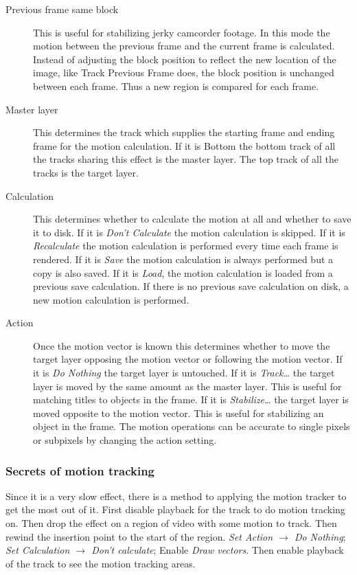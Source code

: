 \begin{description}
    \item[Previous frame same block] This is useful for stabilizing jerky camcorder footage. In this mode the motion between the previous frame and the current frame is calculated. Instead of adjusting the block position to reflect the new location of the image, like Track Previous Frame does, the block position is unchanged between each frame. Thus a new region is compared for each frame.
    \item[Master layer] This determines the track which supplies the starting frame and ending frame for the motion calculation. If it is Bottom the bottom track of all the tracks sharing this effect is the master layer. The top track of all the tracks is the target layer.
    \item[Calculation] This determines whether to calculate the motion at all and whether to save it to disk. If it is \textit{Don't Calculate} the motion calculation is skipped. If it is \textit{Recalculate} the motion calculation is performed every time each frame is rendered. If it is \textit{Save} the motion calculation is always performed but a copy is also saved. If it is \textit{Load}, the motion calculation is loaded from a previous save calculation. If there is no previous save calculation on disk, a new motion calculation is performed.
    \item[Action] Once the motion vector is known this determines whether to move the target layer opposing the motion vector or following the motion vector. If it is \textit{Do Nothing} the target layer is untouched. If it is \textit{Track\dots} the target layer is moved by the same amount as the master layer. This is useful for matching titles to objects in the frame. If it is \textit{Stabilize\dots} the target layer is moved opposite to the motion vector. This is useful for stabilizing an object in the frame. The motion operations can be accurate to single pixels or subpixels by changing the action setting.
\end{description}

\subsubsection*{Secrets of motion tracking}
\label{ssub:secrets_motion_tracking}

Since it is a very slow effect, there is a method to applying the motion tracker to get the most out of it. First disable playback for the track to do motion tracking on. Then drop the effect on a region of video with some motion to track. Then rewind the insertion point to the start of the region. \textit{Set Action $\rightarrow$ Do Nothing}; \textit{Set Calculation $\rightarrow$ Don't calculate}; Enable \textit{Draw vectors}. Then enable playback of the track to see the motion tracking areas.


